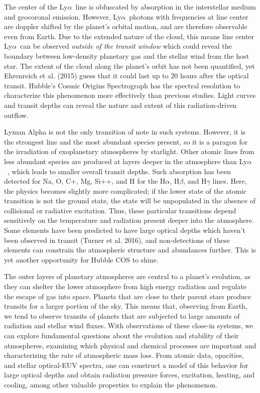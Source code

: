 \documentclass[onecolumn]{aastex63}
\newcommand\lya{Ly$\alpha$\ }
\begin{document}
The center of the \lya line is obfuscated by absorption in the interstellar medium and geocoronal emission. However, \lya photons with frequencies at line center are doppler shifted by the planet's orbital motion, and are therefore observable even from Earth. Due to the extended nature of the cloud, this means line center \lya can be observed \textit{outside of the transit window} which could reveal the boundary between low-density planetary gas and the stellar wind from the host star. The extent of the cloud along the planet's orbit has not been quantified, yet Ehrenreich et al. (2015) guess that it could last up to 20 hours after the optical transit. Hubble's Cosmic Origins Spectrograph has the spectral resolution to characterize this phenomenon more effectively than previous studies. Light curves and transit depths can reveal the nature and extent of this radiation-driven outflow.

Lyman Alpha is not the only transition of note in such systems. However, it is the strongest line and the most abundant species present, so it is a paragon for the irradiation of exoplanetary atmospheres by starlight. Other atomic lines from less abundant species are produced at layers deeper in the atmosphere than \lya, which leads to smaller overall transit depths. Such absorption has been detected for Na, O, C+, Mg, Si++, and H for the H$\alpha$, H$\beta$, and H$\gamma$ lines. Here, the physics becomes slightly more complicated; if the lower state of the atomic transition is not the ground state, the state will be unpopulated in the absence of collisional or radiative excitation. Thus, these particular transitions depend sensitively on the temperature and radiation present deeper into the atmosphere. Some elements have been predicted to have large optical depths which haven't been observed in transit (Turner et al. 2016), and non-detections of these elements can constrain the atmospheric structure and abundances further. This is yet another opportunity for Hubble COS to shine.

The outer layers of planetary atmospheres are central to a planet's evolution, as they can shelter the lower atmosphere from high energy radiation and regulate the escape of gas into space. Planets that are close to their parent stars produce transits for a larger portion of the sky. This means that, observing from Earth, we tend to observe transits of planets that are subjected to large amounts of radiation and stellar wind fluxes. With observations of these close-in systems, we can explore fundamental questions about the evolution and stability of their atmospheres, examining which physical and chemical processes are important and characterizing the rate of atmospheric mass loss. From atomic data, opacities, and stellar optical-EUV spectra, one can construct a model of this behavior for large optical depths and obtain radiation pressure forces, excitation, heating, and cooling, among other valuable properties to explain the phenomenon.
 
\end{document}
